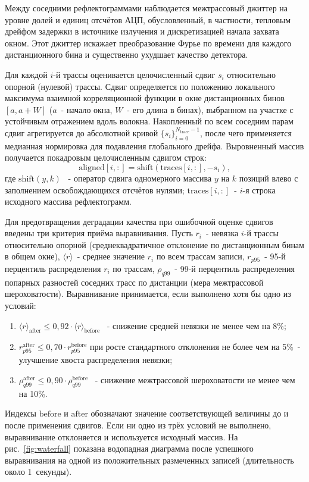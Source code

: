 \documentclass[12pt,a4paper]{extarticle}
\begin{document}
Между соседними рефлектограммами наблюдается межтрассовый джиттер на уровне долей и единиц отсчётов АЦП, обусловленный, в частности, тепловым дрейфом задержки в источнике излучения и дискретизацией начала захвата окном. Этот джиттер искажает преобразование Фурье по времени для каждого дистанционного бина и существенно ухудшает качество детектора.

Для каждой $i$-й трассы оценивается целочисленный сдвиг $s_i$ относительно опорной (нулевой) трассы. Сдвиг определяется по положению локального максимума взаимной корреляционной функции в окне дистанционных бинов $[a, a+W]$ ($a$~- начало окна, $W$~- его длина в бинах), выбранном на участке с устойчивым отражением вдоль волокна. Накопленный по всем соседним парам сдвиг агрегируется до абсолютной кривой $\{s_i\}_{i=0}^{N_\text{trace}-1}$, после чего применяется медианная нормировка для подавления глобального дрейфа. Выровненный массив получается покадровым целочисленным сдвигом строк:
\begin{equation}
  \text{aligned}[i, :] = \mathrm{shift}(\text{traces}[i, :], -s_i),
\end{equation}
где $\mathrm{shift}(y, k)$~ - оператор сдвига одномерного массива $y$ на $k$ позиций влево с заполнением освобождающихся отсчётов нулями; $\text{traces}[i, :]$~- $i$-я строка исходного массива рефлектограмм.

Для предотвращения деградации качества при ошибочной оценке сдвигов введены три критерия приёма выравнивания. Пусть $r_i$~- невязка $i$-й трассы относительно опорной (среднеквадратичное отклонение по дистанционным бинам в общем окне), $\langle r \rangle$~- среднее значение $r_i$ по всем трассам записи, $r_{p95}$~- 95-й перцентиль распределения $r_i$ по трассам, $\rho_{q99}$~- 99-й перцентиль распределения попарных разностей соседних трасс по дистанции (мера межтрассовой шероховатости). Выравнивание принимается, если выполнено хотя бы одно из условий:
\begin{enumerate}[leftmargin=2.5em, label=(\arabic*)]
  \item $\langle r \rangle_\text{after} \le 0{,}92 \cdot \langle r \rangle_\text{before}$~ - снижение средней невязки не менее чем на 8\%;
  \item $r_{p95}^\text{after} \le 0{,}70 \cdot r_{p95}^\text{before}$ при росте стандартного отклонения не более чем на 5\%~- улучшение хвоста распределения невязки;
  \item $\rho_{q99}^\text{after} \le 0{,}90 \cdot \rho_{q99}^\text{before}$~ - снижение межтрассовой шероховатости не менее чем на 10\%.
\end{enumerate}
Индексы $\text{before}$ и $\text{after}$ обозначают значение соответствующей величины до и после применения сдвигов. Если ни одно из трёх условий не выполнено, выравнивание отклоняется и используется исходный массив. На рис.~\ref{fig:waterfall} показана водопадная диаграмма после успешного выравнивания на одной из положительных размеченных записей (длительность около 1~секунды).
\end{document}
